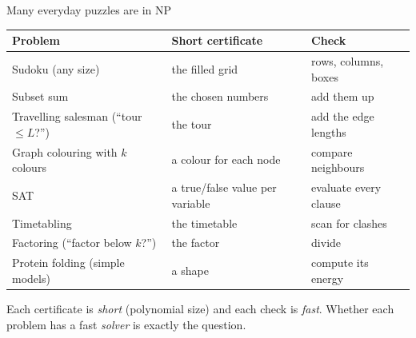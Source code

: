\begin{frame}{Many everyday puzzles are in NP}
\begin{sfig}[0.62]
\begin{tabular}{@{}L{33mm}L{50mm}L{54mm}@{}}
\toprule
\textbf{Problem} & \textbf{Short certificate} & \textbf{Check}\\\midrule
Sudoku (any size) & the filled grid & rows, columns, boxes\\
Subset sum & the chosen numbers & add them up\\
Travelling salesman (``tour $\le L$?'') & the tour & add the edge lengths\\
Graph colouring with $k$ colours & a colour for each node & compare neighbours\\
SAT & a true/false value per variable & evaluate every clause\\
Timetabling & the timetable & scan for clashes\\
Factoring (``factor below $k$?'') & the factor & divide\\
Protein folding (simple models) & a shape & compute its energy\\\bottomrule
\end{tabular}
\end{sfig}
\vspace{1mm}
{\small Each certificate is \emph{short} (polynomial size) and each check is \emph{fast}. Whether each problem has a fast \emph{solver} is exactly the question.}
\end{frame}

